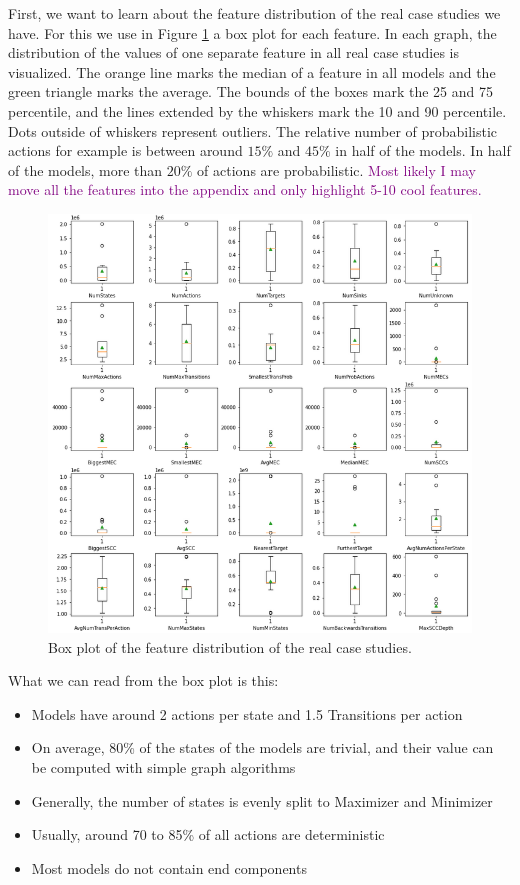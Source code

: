 First, we want to learn about the feature distribution of the real case studies we have. 
For this we use in Figure \ref{fig:Real_FeatureDistribution} a box plot for each feature.
In each graph, the distribution of the values of one separate feature in all real case studies is visualized. 
The orange line marks the median of a feature in all models and the green triangle marks the average.
The bounds of the boxes mark the 25 and 75 percentile, and the lines extended by the whiskers mark the 10 and 90 percentile.
Dots outside of whiskers represent outliers.
The relative number of probabilistic actions for example is between around $15\%$ and $45\%$ in half of the models.
In half of the models, more than $20\%$ of actions are probabilistic.
\textcolor{purple}{Most likely I may move all the features into the appendix and only highlight 5-10 cool features.}
\begin{figure}[t]
    \centering
    \includegraphics[width=1\textwidth]{figures/Real_FeatureDistribution.png}
    \caption[Feature Distribution of the case studies]{
        Box plot of the feature distribution of the real case studies.
    }
    \label{fig:Real_FeatureDistribution}
\end{figure}
What we can read from the box plot is this:
\begin{itemize}
    \item Models have around 2 actions per state and 1.5 Transitions per action
    \item On average, 80\% of the states of the models are trivial, and their value can be computed with simple graph algorithms 
    \item Generally, the number of states is evenly split to Maximizer and Minimizer
    \item Usually, around 70 to 85\% of all actions are deterministic
    \item Most models do not contain end components
\end{itemize}

